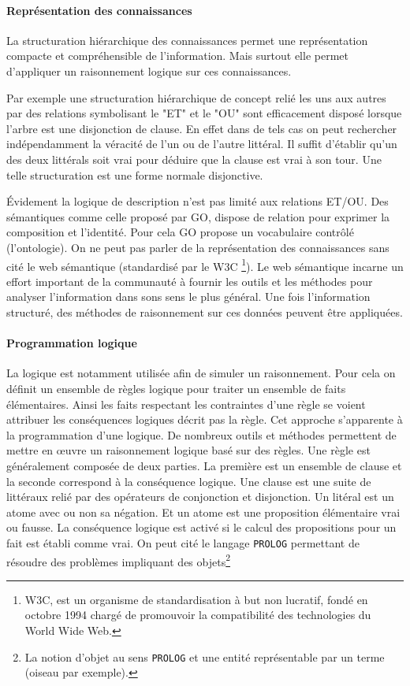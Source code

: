 \begin{refsegment}
    \paragraph{Représentation des connaissances}
    La structuration hiérarchique des connaissances permet une représentation compacte et compréhensible de l'information. Mais surtout elle permet d'appliquer un raisonnement logique sur ces connaissances.
    
    Par exemple une structuration hiérarchique de concept relié les uns aux autres par des relations symbolisant le "ET" et le "OU" sont efficacement disposé lorsque l'arbre est une disjonction de clause.
    En effet dans de tels cas on peut rechercher indépendamment la véracité de l'un ou de l'autre littéral. Il suffit d'établir qu'un des deux littérals soit vrai pour déduire que la clause est vrai à son tour. Une telle structuration est une forme normale disjonctive.
    
    Évidement la logique de description n'est pas limité aux relations ET/OU. Des sémantiques comme celle proposé par \acrfull{GO}, dispose de relation pour exprimer la composition et l'identité. Pour cela  \acrfull{GO} propose un vocabulaire contrôlé (l'ontologie). On ne peut pas parler de la représentation des connaissances sans cité le web sémantique (standardisé par le W3C \footnote{W3C, est un organisme de standardisation à but non lucratif, fondé en octobre 1994 chargé de promouvoir la compatibilité des technologies du World Wide Web.}). Le web sémantique incarne un effort important de la communauté à fournir les outils et les méthodes pour analyser l'information dans sons sens le plus général. Une fois l'information structuré, des méthodes de raisonnement sur ces données peuvent être appliquées.
    
    \paragraph{Programmation logique} La logique est notamment utilisée afin de simuler un raisonnement. Pour cela on définit un ensemble de règles logique pour traiter un ensemble de faits élémentaires. Ainsi les faits respectant les contraintes d'une règle se voient attribuer les conséquences logiques décrit pas la règle. Cet approche s'apparente à la programmation d'une logique. De nombreux outils et méthodes permettent de mettre en œuvre un raisonnement logique basé sur des règles. Une règle est généralement composée de deux parties. La première est un ensemble de clause et la seconde correspond à la conséquence logique.
    Une clause est une suite de littéraux relié par des opérateurs de conjonction et disjonction. Un litéral est un atome avec ou non sa négation. Et un atome est une proposition élémentaire vrai ou fausse. La conséquence logique est activé si le calcul des propositions pour un fait est établi comme vrai. On peut cité le langage \texttt{PROLOG} \cite{colmerauer1990introduction,clocksin2003programming} permettant de résoudre des problèmes impliquant des objets\footnote{La notion d'objet au sens \texttt{PROLOG} et une entité représentable par un terme (oiseau par exemple). }
    

\end{refsegment}
